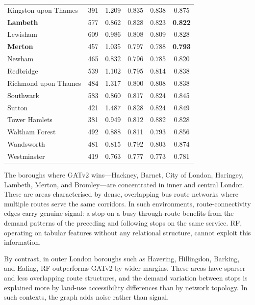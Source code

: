 \documentclass[12pt,a4paper]{report}
\begin{document}
\begin{table}[ht]
\begin{tabular}{lrcccc}
    Kingston upon Thames   & 391  & 1.209 & 0.835 & 0.838 & 0.875 \\
    \textbf{Lambeth}       & 577  & 0.862 & 0.828 & 0.823 & \textbf{0.822} \\
    Lewisham               & 609  & 0.986 & 0.808 & 0.809 & 0.828 \\
    \textbf{Merton}        & 457  & 1.035 & 0.797 & 0.788 & \textbf{0.793} \\
    Newham                 & 465  & 0.832 & 0.796 & 0.785 & 0.820 \\
    Redbridge              & 539  & 1.102 & 0.795 & 0.814 & 0.838 \\
    Richmond upon Thames   & 484  & 1.317 & 0.800 & 0.808 & 0.838 \\
    Southwark              & 583  & 0.860 & 0.817 & 0.824 & 0.845 \\
    Sutton                 & 421  & 1.487 & 0.828 & 0.824 & 0.849 \\
    Tower Hamlets          & 381  & 0.949 & 0.812 & 0.882 & 0.828 \\
    Waltham Forest         & 492  & 0.888 & 0.811 & 0.793 & 0.856 \\
    Wandsworth             & 481  & 0.815 & 0.792 & 0.803 & 0.874 \\
    Westminster            & 419  & 0.763 & 0.777 & 0.773 & 0.781 \\
    \bottomrule
  \end{tabular}
\end{table}

The boroughs where GATv2 wins---Hackney, Barnet, City of London, Haringey,
Lambeth, Merton, and Bromley---are concentrated in inner and central London.
These are areas characterised by dense, overlapping bus route networks where
multiple routes serve the same corridors. In such environments, route-connectivity
edges carry genuine signal: a stop on a busy through-route benefits from
the demand patterns of the preceding and following stops on the same service.
RF, operating on tabular features without any relational structure, cannot
exploit this information.

By contrast, in outer London boroughs such as Havering, Hillingdon, Barking,
and Ealing, RF outperforms GATv2 by wider margins. These areas have sparser
and less overlapping route structures, and the demand variation between stops
is explained more by land-use accessibility differences than by network
topology. In such contexts, the graph adds noise rather than signal.
\end{document}
